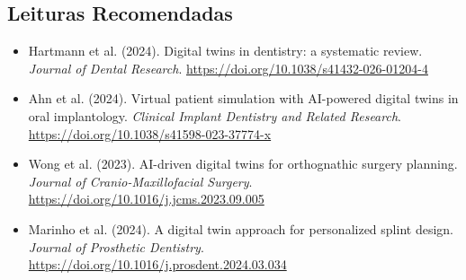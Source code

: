\subsection*{Leituras Recomendadas}
\begin{itemize}
    \item Hartmann et al. (2024). Digital twins in dentistry: a systematic review. \textit{Journal of Dental Research}. \url{https://doi.org/10.1038/s41432-026-01204-4}
    \item Ahn et al. (2024). Virtual patient simulation with AI-powered digital twins in oral implantology. \textit{Clinical Implant Dentistry and Related Research}. \url{https://doi.org/10.1038/s41598-023-37774-x}
    \item Wong et al. (2023). AI-driven digital twins for orthognathic surgery planning. \textit{Journal of Cranio-Maxillofacial Surgery}. \url{https://doi.org/10.1016/j.jcms.2023.09.005}
    \item Marinho et al. (2024). A digital twin approach for personalized splint design. \textit{Journal of Prosthetic Dentistry}. \url{https://doi.org/10.1016/j.prosdent.2024.03.034}
\end{itemize}
